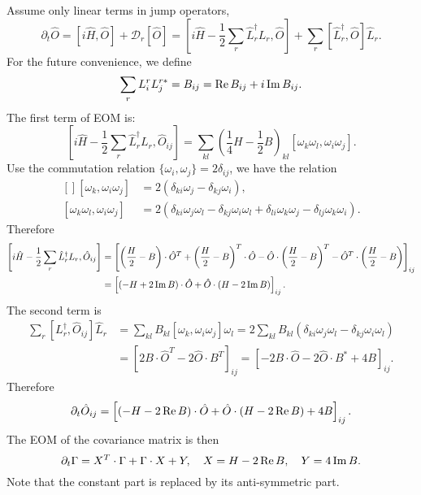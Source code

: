 \documentclass{SciPost}
\begin{document}
Assume only linear terms in jump operators,
\begin{equation}
	\partial_t \hat O = \left[i\hat H,\hat O\right] + \mathcal D_r[\hat O] 
	= \left[i\hat H - \frac{1}{2}\sum_r \hat L_r^\dagger L_r,\hat O\right] + \sum_r \left[\hat L_r^\dagger,\hat O\right]\hat L_r.
\end{equation}
For the future convenience, we define 
\begin{equation}
	\sum_r L_i^r L_j^{r*} = B_{ij} = \operatorname{Re} B_{ij} + i \operatorname{Im} B_{ij}. 
\end{equation}
The first term of EOM is:
\begin{equation*}
	\left[i\hat H - \frac{1}{2}\sum_r \hat L_r^\dagger L_r,\hat O_{ij}\right]
	= \sum_{kl}\left(\frac{1}{4}H-\frac{1}{2}B \right)_{kl} [\omega_k \omega_l, \omega_i \omega_j].
\end{equation*}
Use the commutation relation $\{\omega_i, \omega_j\} = 2\delta_{ij}$, we have the relation 
\begin{equation}
\begin{aligned}[]
	[\omega_k,\omega_i \omega_j] &= 2(\delta_{ki}\omega_j-\delta_{kj}\omega_i),\\
	[\omega_k \omega_l, \omega_i \omega_j] &= 2(\delta_{ki}\omega_j \omega_l-\delta_{kj} \omega_i \omega_l + \delta_{li}\omega_k \omega_j - \delta_{lj}\omega_k\omega_i).
\end{aligned}
\end{equation}
Therefore
\begin{equation*}
\begin{aligned}[]
	\left[i\hat H - \frac{1}{2}\sum_r \hat L_r^\dagger L_r,\hat O_{ij}\right]
	&= \left[
		\left(\frac{H}{2}- B\right) \cdot \hat O^T + \left(\frac{H}{2}- B\right)^T \cdot \hat O
		- \hat O \cdot \left(\frac{H}{2}- B\right)^T- \hat O^T \cdot \left(\frac{H}{2}- B\right)
	\right]_{ij} \\
	&= \left[
		(-H+2\im B) \cdot \hat O + \hat O \cdot (H-2\im B)
	\right]_{ij}.
\end{aligned}
\end{equation*}
The second term is
\begin{equation*}
\begin{aligned}
	\sum_r \left[L_r^\dagger, \hat O_{ij}\right] \hat L_r
	&= \sum_{kl} B_{kl} [\omega_k, \omega_i \omega_j]\omega_l
	= 2\sum_{kl} B_{kl}\left(
		\delta_{ki} \omega_j \omega_l - 
		\delta_{kj} \omega_i \omega_l\right) \\
	&= \left[2B\cdot \hat O^T - 2\hat O\cdot B^T\right]_{ij}
	= \left[-2B\cdot \hat O - 2\hat O\cdot B^* + 4B\right]_{ij}.
\end{aligned}
\end{equation*}
Therefore
\begin{equation}
	\partial_t \hat O_{ij} = \left[
		(-H-2\operatorname{Re} B) \cdot \hat O + \hat O \cdot (H-2\operatorname{Re}{B}) + 4B
	\right]_{ij}.
\end{equation}
The EOM of the covariance matrix is then
\begin{equation}
	\partial_t \Gamma = X^T\cdot\Gamma + \Gamma \cdot X + Y,\quad
	X = H - 2\operatorname{Re}{B},\quad Y = 4\operatorname{Im}{B}.
\end{equation}
Note that the constant part is replaced by its anti-symmetric part.
\end{document}
